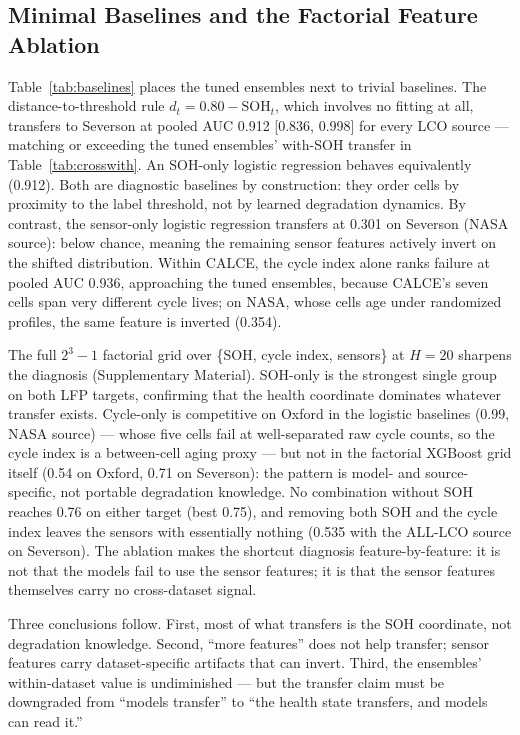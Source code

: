 \subsection{Minimal Baselines and the Factorial Feature Ablation}
Table~\ref{tab:baselines} places the tuned ensembles next to trivial baselines. The distance-to-threshold rule $d_t = 0.80 - \mathrm{SOH}_t$, which involves no fitting at all, transfers to Severson at pooled AUC 0.912 [0.836, 0.998] for every LCO source --- matching or exceeding the tuned ensembles' with-SOH transfer in Table~\ref{tab:crosswith}. An SOH-only logistic regression behaves equivalently (0.912). Both are diagnostic baselines by construction: they order cells by proximity to the label threshold, not by learned degradation dynamics. By contrast, the sensor-only logistic regression transfers at 0.301 on Severson (NASA source): below chance, meaning the remaining sensor features actively invert on the shifted distribution. Within CALCE, the cycle index alone ranks failure at pooled AUC 0.936, approaching the tuned ensembles, because CALCE's seven cells span very different cycle lives; on NASA, whose cells age under randomized profiles, the same feature is inverted (0.354).

The full $2^3-1$ factorial grid over \{SOH, cycle index, sensors\} at $H{=}20$ sharpens the diagnosis (Supplementary Material). SOH-only is the strongest single group on both LFP targets, confirming that the health coordinate dominates whatever transfer exists. Cycle-only is competitive on Oxford in the logistic baselines (0.99, NASA source) --- whose five cells fail at well-separated raw cycle counts, so the cycle index is a between-cell aging proxy --- but not in the factorial XGBoost grid itself (0.54 on Oxford, 0.71 on Severson): the pattern is model- and source-specific, not portable degradation knowledge. No combination without SOH reaches 0.76 on either target (best 0.75), and removing both SOH and the cycle index leaves the sensors with essentially nothing (0.535 with the ALL-LCO source on Severson). The ablation makes the shortcut diagnosis feature-by-feature: it is not that the models fail to use the sensor features; it is that the sensor features themselves carry no cross-dataset signal.

Three conclusions follow. First, most of what transfers is the SOH coordinate, not degradation knowledge. Second, ``more features'' does not help transfer; sensor features carry dataset-specific artifacts that can invert. Third, the ensembles' within-dataset value is undiminished --- but the transfer claim must be downgraded from ``models transfer'' to ``the health state transfers, and models can read it.''

